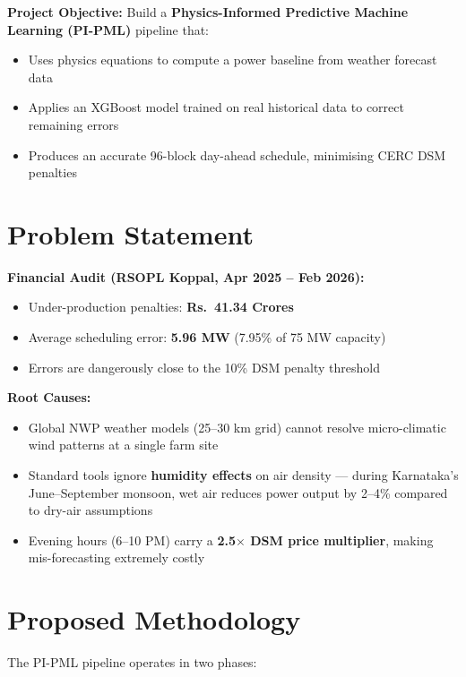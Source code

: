 \documentclass[11pt,a4paper]{article}
\begin{document}
\textbf{Project Objective:} Build a \textbf{Physics-Informed Predictive Machine Learning (PI-PML)} pipeline that:
\begin{itemize}
    \item Uses physics equations to compute a power baseline from weather forecast data
    \item Applies an XGBoost model trained on real historical data to correct remaining errors
    \item Produces an accurate 96-block day-ahead schedule, minimising CERC DSM penalties
\end{itemize}

\section{Problem Statement}

\textbf{Financial Audit (RSOPL Koppal, Apr 2025 -- Feb 2026):}
\begin{itemize}
    \item Under-production penalties: \textbf{Rs.\ 41.34 Crores}
    \item Average scheduling error: \textbf{5.96 MW} (7.95\% of 75 MW capacity)
    \item Errors are dangerously close to the 10\% DSM penalty threshold
\end{itemize}

\textbf{Root Causes:}
\begin{itemize}
    \item Global NWP weather models (25--30 km grid) cannot resolve micro-climatic wind patterns at a single farm site
    \item Standard tools ignore \textbf{humidity effects} on air density --- during Karnataka's June--September monsoon, wet air reduces power output by 2--4\% compared to dry-air assumptions
    \item Evening hours (6--10 PM) carry a \textbf{2.5$\times$ DSM price multiplier}, making mis-forecasting extremely costly
\end{itemize}

\section{Proposed Methodology}

The PI-PML pipeline operates in two phases:
\end{document}
